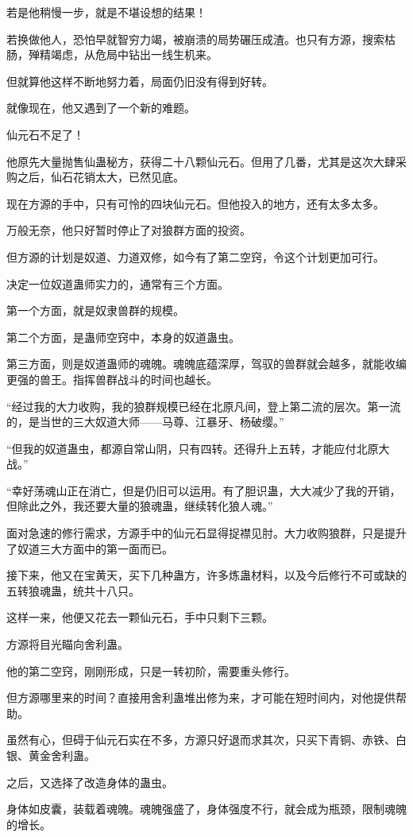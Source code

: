 \begin{this_body}
若是他稍慢一步，就是不堪设想的结果！

若换做他人，恐怕早就智穷力竭，被崩溃的局势碾压成渣。也只有方源，搜索枯肠，殚精竭虑，从危局中钻出一线生机来。

但就算他这样不断地努力着，局面仍旧没有得到好转。

就像现在，他又遇到了一个新的难题。

仙元石不足了！

他原先大量抛售仙蛊秘方，获得二十八颗仙元石。但用了几番，尤其是这次大肆采购之后，仙石花销太大，已然见底。

现在方源的手中，只有可怜的四块仙元石。但他投入的地方，还有太多太多。

万般无奈，他只好暂时停止了对狼群方面的投资。

但方源的计划是奴道、力道双修，如今有了第二空窍，令这个计划更加可行。

决定一位奴道蛊师实力的，通常有三个方面。

第一个方面，就是奴隶兽群的规模。

第二个方面，是蛊师空窍中，本身的奴道蛊虫。

第三方面，则是奴道蛊师的魂魄。魂魄底蕴深厚，驾驭的兽群就会越多，就能收编更强的兽王。指挥兽群战斗的时间也越长。

“经过我的大力收购，我的狼群规模已经在北原凡间，登上第二流的层次。第一流的，是当世的三大奴道大师——马尊、江暴牙、杨破缨。”

“但我的奴道蛊虫，都源自常山阴，只有四转。还得升上五转，才能应付北原大战。”

“幸好荡魂山正在消亡，但是仍旧可以运用。有了胆识蛊，大大减少了我的开销，但除此之外，我还要大量的狼魂蛊，继续转化狼人魂。”

面对急速的修行需求，方源手中的仙元石显得捉襟见肘。大力收购狼群，只是提升了奴道三大方面中的第一面而已。

接下来，他又在宝黄天，买下几种蛊方，许多炼蛊材料，以及今后修行不可或缺的五转狼魂蛊，统共十八只。

这样一来，他便又花去一颗仙元石，手中只剩下三颗。

方源将目光瞄向舍利蛊。

他的第二空窍，刚刚形成，只是一转初阶，需要重头修行。

但方源哪里来的时间？直接用舍利蛊堆出修为来，才可能在短时间内，对他提供帮助。

虽然有心，但碍于仙元石实在不多，方源只好退而求其次，只买下青铜、赤铁、白银、黄金舍利蛊。

之后，又选择了改造身体的蛊虫。

身体如皮囊，装载着魂魄。魂魄强盛了，身体强度不行，就会成为瓶颈，限制魂魄的增长。


\end{this_body}
